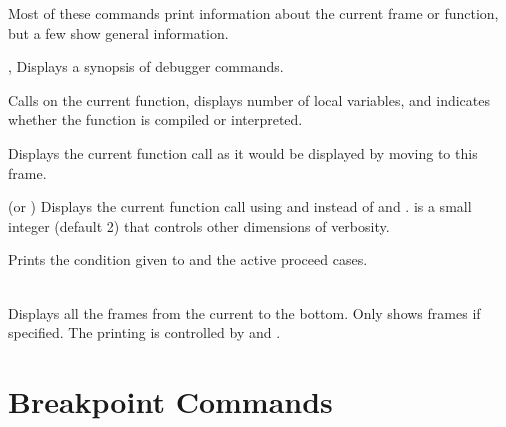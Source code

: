 Most of these commands print information about the current frame or
function, but a few show general information.

\begin{Lentry}

\item[\code{help}, \code{?}]
Displays a synopsis of debugger commands.

\item[\code{describe}]
Calls  on the current function, displays number of local
variables, and indicates whether the function is compiled or interpreted.

\item[\code{print}]
Displays the current function call as it would be displayed by moving to
this frame.

\item[\code{vprint} (or \code{pp}) \mopt{\var{verbosity}}]%
Displays the current function call using  and
 instead of  and
.   is a small integer
(default 2) that controls other dimensions of verbosity.

\item[\code{error}]
Prints the condition given to  and the active
proceed cases.

\item[\code{backtrace} \mopt{\var{n}}]\hfill\\
Displays all the frames from the current to the bottom.  Only shows
 frames if specified.  The printing is controlled by
 and .

% 
% 
% 
\end{Lentry}


\section{Breakpoint Commands}

